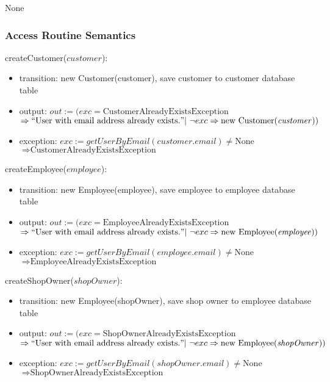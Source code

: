 \documentclass[12pt, titlepage]{article}
\begin{document}
None

\subsubsection{Access Routine Semantics}

\noindent createCustomer($customer$):
\begin{itemize}
	\item transition: new Customer(customer), save customer to customer database table
	\item output: $out := (exc = \text{CustomerAlreadyExistsException}$ \\ $\Rightarrow ``\text{User with
			      email address already exists.}" |\ \neg exc \Rightarrow \text{new Customer(\emph{customer})})$
	\item exception: $exc := getUserByEmail(customer.email) \neq \text{None}$ \\ $\Rightarrow
		      \text{CustomerAlreadyExistsException}$
\end{itemize}

\noindent createEmployee($employee$):
\begin{itemize}
	\item transition: new Employee(employee), save employee to employee database table
	\item output: $out := (exc = \text{EmployeeAlreadyExistsException}$ \\ $\Rightarrow ``\text{User with
			      email address already exists.}" |\ \neg exc \Rightarrow \text{new Employee(\emph{employee})})$
	\item exception: $exc := getUserByEmail(employee.email) \neq \text{None}$ \\ $\Rightarrow
		      \text{EmployeeAlreadyExistsException}$
\end{itemize}

\noindent createShopOwner($shopOwner$):
\begin{itemize}
	\item transition: new Employee(shopOwner), save shop owner to employee database table
	\item output: $out := (exc = \text{ShopOwnerAlreadyExistsException}$ \\ $\Rightarrow ``\text{User with
			      email address already exists.}" |\ \neg exc \Rightarrow \text{new Employee(\emph{shopOwner})})$
	\item exception: $exc := getUserByEmail(shopOwner.email) \neq \text{None}$ \\ $\Rightarrow
		      \text{ShopOwnerAlreadyExistsException}$
\end{itemize}
\end{document}
